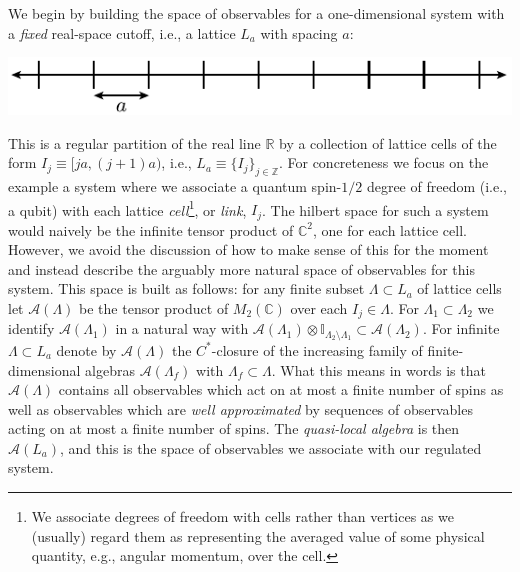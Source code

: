 \documentclass[11pt]{amsart}
\theoremstyle{plain}%
\theoremstyle{definition}
\theoremstyle{remark}
\begin{document}
We begin by building the space of observables for a one-dimensional system with a \emph{fixed} real-space cutoff, i.e., a lattice $L_a$ with spacing $a$: 
\begin{center}
	\includegraphics{lattice.pdf}
\end{center}
This is a regular partition of the real line $\mathbb{R}$ by a collection of lattice cells of the form $I_j \equiv [ja, (j+1)a)$, i.e., $L_a \equiv \{I_j\}_{j\in \mathbb{Z}}$. For concreteness we focus on the example a system where we associate a quantum spin-$1/2$ degree of freedom (i.e., a qubit) with each lattice \emph{cell}\footnote{We associate degrees of freedom with cells rather than vertices as we (usually) regard them as representing the averaged value of some physical quantity, e.g., angular momentum, over the cell.}, or \emph{link}, $I_j$. The hilbert space for such a system would naively be the infinite tensor product of $\mathbb{C}^2$, one for each lattice cell. However, we avoid the discussion of how to make sense of this for the moment and instead describe the arguably more natural space of observables for this system. This space is built as follows: for any finite subset $\Lambda \subset L_a$ of lattice cells let $\mathcal{A}(\Lambda)$ be the tensor product of $M_2(\mathbb{C})$ over each $I_j\in \Lambda$. For $\Lambda_1\subset \Lambda_2$ we identify $\mathcal{A}(\Lambda_1)$ in a natural way with $\mathcal{A}(\Lambda_1)\otimes \mathbb{I}_{\Lambda_2\setminus \Lambda_1} \subset \mathcal{A}(\Lambda_2)$. For infinite $\Lambda \subset L_a$ denote by $\mathcal{A}(\Lambda)$ the $C^*$-closure of the increasing family of finite-dimensional algebras $\mathcal{A}(\Lambda_f)$ with $\Lambda_f \subset \Lambda$. What this means in words is that $\mathcal{A}(\Lambda)$ contains all observables which act on at most a finite number of spins as well as observables which are \emph{well approximated} by sequences of observables acting on at most a finite number of spins. The \emph{quasi-local algebra} is then $\mathcal{A}(L_a)$, and this is the space of observables we associate with our regulated system. 
\end{document}
